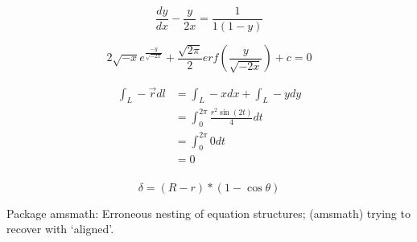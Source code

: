 \documentclass[UTF8]{article}
\begin{document}
\begin{equation}
    \frac{dy}{dx}-\frac{y}{2x}=\frac{1}{1(1-y)}
\end{equation}
     
\begin{equation}
    2\sqrt{-x}e^{\frac{-y}{\sqrt{-2x}}}+
    \frac{\sqrt{2\pi}}{2}erf \left( \frac{y}{\sqrt{-2x}} \right)+c=0
\end{equation}




\begin{equation}
\label{1}
\begin{split}
    \int _L - \vec r dl &=\int _L - x dx+\int _L -  y dy \\
    &=\int _0 ^{2\pi}   \frac {r^2 \sin (2t)}{4}   dt\\
    &=\int _0 ^{2\pi} 0 dt \\
   & =0\\
\end{split}
\end{equation}
 
 


\begin{equation}
\label{}
\delta = (R-r)*(1-\cos \theta)
\end{equation}
 
Package amsmath: Erroneous nesting of equation structures;
(amsmath)	trying to recover with `aligned'.
\end{document}
